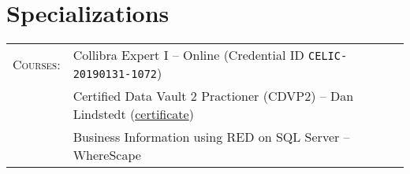 \documentclass[a4paper,10pt]{article}
\begin{document}
\section{Specializations}
\begin{tabular}{rl}
  \textsc{Courses:}
  &Collibra Expert I -- Online (Credential ID \texttt{\scriptsize{CELIC-20190131-1072}})\\
  &Certified Data Vault 2 Practioner (CDVP2) -- Dan Lindstedt (\href{https://max.pow.is/assets/5_2_12900_1435331244_CDVP2_Certificate.pdf}{certificate})\\
  &Business Information using RED on SQL Server -- WhereScape
\end{tabular}
\end{document}
